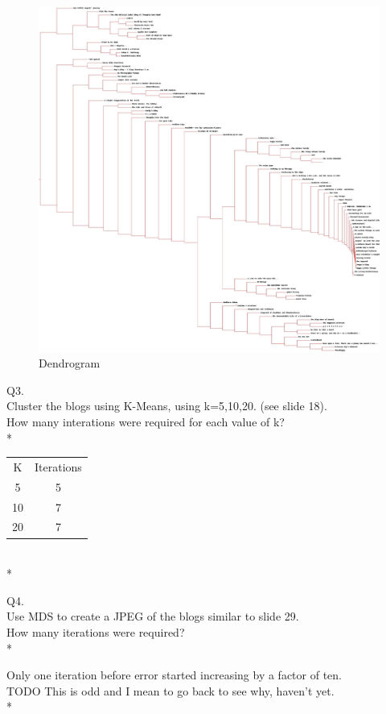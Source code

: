 \documentclass{article}
\begin{document}
\graphicspath{{q1/}}
\begin{figure}[H]
  \centering
  \caption{Dendrogram}
  \includegraphics[scale=.2]{dendrogram.jpg}
\end{figure}
\clearpage

Q3.\\
Cluster the blogs using K-Means, using k=5,10,20. (see slide 18).\\
How many interations were required for each value of k?\\*
\begin{tabular}{c c}\\
K & Iterations\\
5 & 5\\
10 & 7\\
20 & 7\\
\end{tabular}
\\*

Q4.\\
Use MDS to create a JPEG of the blogs similar to slide 29.\\
How many iterations were required?\\*

Only one iteration before error started increasing by a factor of ten.\\
TODO This is odd and I mean to go back to see why, haven't yet.\\*
\end{document}
